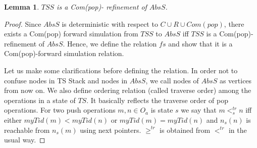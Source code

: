 \documentclass{article}
\newtheorem{lem}{Lemma}
\begin{document}
\begin{lem}
$TSS$ is a Com(pop)- refinement of $AbsS$. 
\end{lem}
\begin{proof}
Since $AbsS$ is deterministic with respect to $C \cup R \cup Com(pop)$, there exists a Com(pop) forward simulation from $TSS$ to $AbsS$ iff $TSS$ is a Com(pop)-refinement of $AbsS$. Hence, we define the relation $fs$ and show that it is a Com(pop)-forward simulation relation.

Let us make some clarifications before defining the relation. In order not to confuse nodes in TS Stack and nodes in $AbsS$, we call nodes of $AbsS$ as vertices from now on. We also define ordering relation (called traverse order) among the operations in a state of $TS$. It basically reflects the traverse order of pop operations. For two push operations $m,n \in O_a$ is state $s$ we say that $m <^{tr}_s n$ iff either $myTid(m) < myTid(n)$ or $myTid(m) = myTid(n)$ and $n_s(n)$ is reachable from $n_s(m)$ using next pointers. $\geq^{tr}$ is obtained from $<^{tr}$ in the usual way.


\end{proof}
\end{document}
